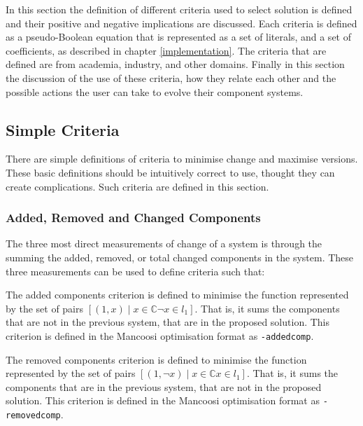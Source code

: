 In this section the definition of different criteria used to select solution is defined and their positive and negative implications are discussed.
Each criteria is defined as a pseudo-Boolean equation that is represented as a set of literals, and a set of coefficients, as described in chapter \ref{implementation}.  
The criteria that are defined are from academia, industry, and other domains.
Finally in this section the discussion of the use of these criteria, how they relate each other and the possible actions the user can take to evolve their component systems.  

\subsection{Simple Criteria}
There are simple definitions of criteria to minimise change and maximise versions.
These basic definitions should be intuitively correct to use, thought they can create complications.
Such criteria are defined in this section.

\subsubsection{Added, Removed and Changed Components}
The three most direct measurements of change of a system is through the summing the added, removed, or total changed components in the system.
These three measurements can be used to define criteria such that:
\begin{defs}
	  The added components criterion is defined to minimise the function
	represented by the set of pairs $[(1,x) \mid x \in \mathbb{C} \neg x \in l_1]$.
	That is, it sums the components that are not in the previous system, that are in the proposed solution.
	This criterion is defined in the Mancoosi optimisation format as \verb+-addedcomp+.

\end{defs}

\begin{defs}
	 The removed components criterion is defined to minimise the function 
	represented by the set of pairs $[(1,\neg x) \mid x \in \mathbb{C} x \in l_1]$.
	That is, it sums the components that are in the previous system, that are not in the proposed solution.
	This criterion is defined in the Mancoosi optimisation format as \verb+-removedcomp+.
\end{defs}


